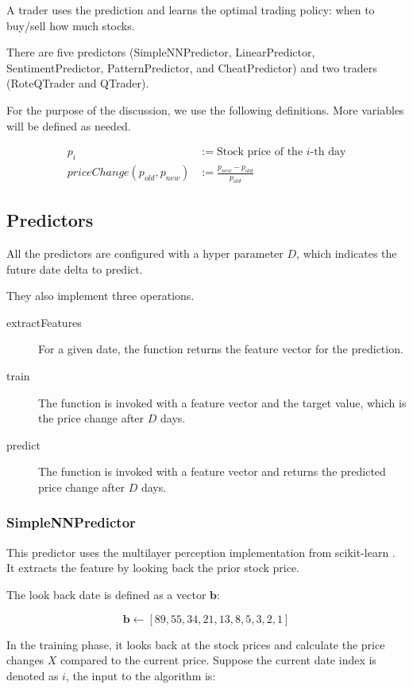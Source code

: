 \documentclass[twocolumn,10pt]{asme2ej}
\newcommand{\vect}[1]{\boldsymbol{#1}}
\begin{document}
A trader uses the prediction and learns the optimal trading policy:
when to buy/sell how much stocks.

There are five predictors (SimpleNNPredictor, LinearPredictor,
SentimentPredictor, PatternPredictor, and CheatPredictor) and two
traders (RoteQTrader and QTrader). 

For the purpose of the discussion, we use the following definitions. More
variables will be defined as needed.

\begin{align*}
p_i &:= \text{Stock price of the }i\text{-th day} \\
priceChange(p_{old}, p_{new}) &:= \frac{p_{new} - p_{old}}{p_{old}}
\end{align*}

\subsection{Predictors}

All the predictors are configured with a hyper parameter $D$, which indicates
the future date delta to predict. 

They also implement three operations.

\begin{description}
  \item[extractFeatures] For a given date, the function returns the feature
    vector for the prediction.
  \item[train] The function is invoked with a feature vector and the target
    value, which is the price change after $D$ days.
  \item[predict] The function is invoked with a feature vector and returns the
    predicted price change after $D$ days.
\end{description}

\subsubsection{SimpleNNPredictor}
This predictor uses the multilayer perception implementation from
scikit-learn \cite{web:scikit_learn}. It extracts the feature by
looking back the prior stock price.

The look back date is defined as a vector $\vect{b}$:

\[
\vect{b} \gets [89, 55, 34, 21, 13, 8, 5, 3, 2, 1]
\]

In the training phase, it looks back at the stock prices and calculate
the price changes $X$ compared to the current price. Suppose the
current date index is denoted as $i$, the input to the algorithm is:
\end{document}
